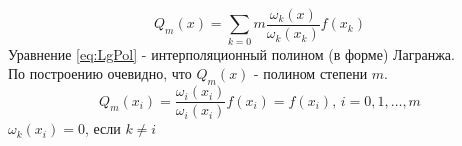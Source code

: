 \documentclass[a4paper,11pt]{article}
\begin{document}
\begin{equation}
  Q_m(x) = \sum_{k=0}{m} \frac{\omega_k(x)}{\omega_k(x_k)} f(x_k)
  \label{eq:LgPol}
\end{equation}
Уравнение \ref{eq:LgPol} - интерполяционный полином (в форме) Лагранжа. \\
По построению очевидно, что $Q_m(x)$ - полином степени $m$.
\[Q_m(x_i) = \frac{\omega_i(x_i)}{\omega_i(x_i)} f(x_i) = f(x_i), \, i=0,1,\dots,m\]
\(\omega_k(x_i) = 0\), если \(k \ne i\)
\end{document}
